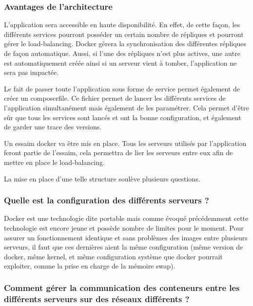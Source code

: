 \subsubsection{Avantages de l'architecture}

\par L’application sera accessible en haute disponibilité. En effet, de cette façon, les différents services pourront posséder un certain nombre de répliques et pourront gérer le load-balancing. Docker gérera la synchronisation des différentes répliques de façon automatique. Aussi, si l’une des répliques n’est plus actives, une autre est automatiquement créée ainsi si un serveur vient à tomber, l’application ne sera pas impactée. 

\par Le fait de passer toute l’application sous forme de service permet également de créer un composerfile. Ce fichier permet de lancer les différents services de l’application simultanément mais également de les paramétrer. Cela permet d’être sûr que tous les services sont lancés et ont la bonne configuration, et également de garder une trace des versions.

\par Un essaim docker va être mis en place. Tous les serveurs utilisés par l’application feront partie de l’essaim, cela permettra de lier les serveurs entre eux afin de mettre en place le load-balancing.

\par La mise en place d’une telle structure soulève plusieurs questions.

	\subsubsection{Quelle est la configuration des différents serveurs ?} 

\par Docker est une technologie dite portable mais comme évoqué précédemment cette technologie est encore jeune et possède nombre de limites pour le moment. Pour assurer un fonctionnement identique et sans problèmes des images entre plusieurs serveurs, il faut que ces dernières aient la même configuration (même version de docker, même kernel, et même configuration système que docker pourrait exploiter, comme la prise en charge de la mémoire swap). 

	\subsubsection{Comment gérer la communication des conteneurs entre les différents serveurs sur des réseaux différents ?} 

